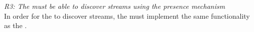 \noindent\textit{R3: The  must be able to discover streams using the presence mechanism} \\
In order for the \hist{} to discover streams, the \hist{} must implement the same functionality as the \sub{}.



